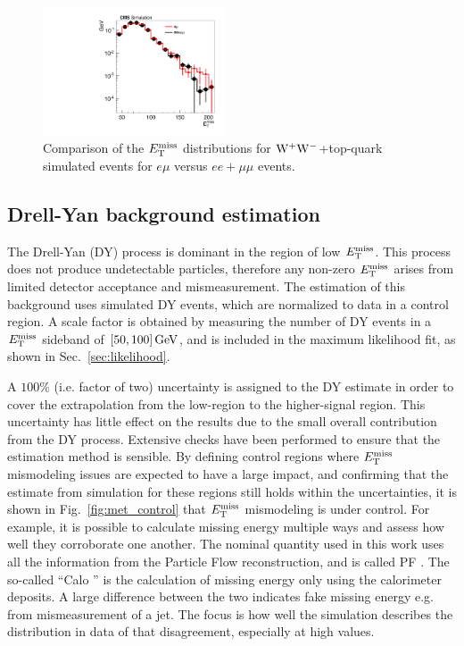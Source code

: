 \begin{figure}[hbtp]
\centering
\includegraphics[width=0.48\textwidth]{figures/met_tt_ww.pdf}
\caption{Comparison of the $E_\mathrm{T}^{\mathrm{miss}}$ distributions for $\mathrm{W}^+\mathrm{W}^-$+top-quark simulated 
events for $e\mu$ versus $ee+\mu\mu$ events.} 
\label{fig:met_tt_ww}
\end{figure}

\newpage
\subsection{Drell-Yan background estimation}
The Drell-Yan (DY) process is dominant in the region of low $E_{\mathrm{T}}^{\text{miss}}$.
This process does not produce undetectable particles, therefore any non-zero $E_{\mathrm{T}}^{\text{miss}}$ arises from
limited detector acceptance and mismeasurement.
The estimation of this background uses simulated DY events, which are normalized to data in a control region.
A scale factor is obtained by measuring the number of DY events in a $E_\mathrm{T}^{\mathrm{miss}}$ sideband of $[50, 100]\,\text{Ge\hspace{-.08em}V}$,
and is included in the maximum likelihood fit, as shown in Sec.~\ref{sec:likelihood}.

A $100\%$ (i.e. factor of two) uncertainty is assigned to the DY estimate in order to cover the extrapolation from the low-\met region to the higher-\met signal region.
This uncertainty has little effect on the results due to the small overall contribution from the DY process.
Extensive checks have been performed to ensure that the estimation method is sensible.
By defining control regions where $E_\mathrm{T}^{\mathrm{miss}}$ mismodeling issues are expected to have a large impact, and confirming that the 
estimate from simulation for these regions still holds within the uncertainties, it is shown in Fig.~\ref{fig:met_control} that $E_\mathrm{T}^{\mathrm{miss}}$ mismodeling is under control.
For example, it is possible to calculate missing energy multiple ways and assess how well they corroborate one another.
The nominal \met quantity used in this work uses all the information from the Particle Flow reconstruction, and is called PF \met.
The so-called ``Calo \met'' is the calculation of missing energy only using the calorimeter deposits.
A large difference between the two indicates fake missing energy e.g. from mismeasurement of a jet.
The focus is how well the simulation describes the distribution in data of that disagreement, especially at high values.

